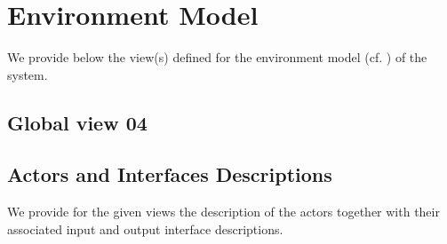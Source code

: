 \chapter{Environment Model}
\label{chap:lu.uni.lassy.excalibur.MyCrash.G02-EM}



We provide below the view(s) defined for the \msrmessir environment model (cf. \cite{messirbook}) of the system. 




\section{Global view 04}
\label{sec:lu.uni.lassy.excalibur.MyCrash.G02-EM-view-04-global}




\section{Actors and Interfaces Descriptions}
\label{sec:lu.uni.lassy.excalibur.MyCrash.G02-EM-Actors-Descriptions}


		
We provide for the given views the description of the actors together with their associated input and output interface descriptions.







